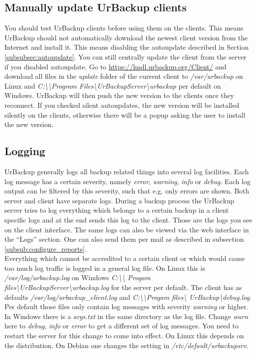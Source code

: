 \documentclass[a4paper,10pt]{article}
\begin{document}
\subsection{Manually update UrBackup clients}
\label{subsec:manually_update_client}

You should test UrBackup clients before using them on the clients. This means
UrBackup should not automatically download the newest client version from
the Internet and install it. This means disabling the autoupdate described in
Section \ref{subsubsec:autoupdate}. You can still centrally update the client
from the server if you disabled autoupdate. Go to \url{https://hndl.urbackup.org/Client/}
and download all files in the \textsl{update} folder of the current client to \textsl{/var/urbackup} on Linux and
\textsl{C:\textbackslash\textbackslash Program Files\textbackslash UrBackupServer\textbackslash urbackup} per default on Windows. UrBackup
will then push the new version to the clients once they reconnect. If you checked
silent autoupdates, the new version will be installed silently on the clients, otherwise
there will be a popup asking the user to install the new version.

\subsection{Logging}
\label{sec:logging}

UrBackup generally logs all backup related things into several log facilities.
Each log message has a certain severity, namely \textsl{error},
\textsl{warning}, \textsl{info} or \textsl{debug}.
Each log output can be filtered by this severity, such that e.g. only errors are
shown. Both server and client have separate logs. During a backup process the
UrBackup server tries to log everything which belongs to a certain backup in a
client specific logs and at the end sends this log to the client. Those are the
logs you see on the client interface. The same logs can also be viewed via the
web interface in the ``Logs'' section. One can also send them per mail as
described in subsection \ref{subsub:configure_reports}.\\
Everything which cannot be accredited to a certain client or which would cause
too much log traffic is logged in a general log file. On Linux this is
\textsl{/var/log/urbackup.log} on Windows \textsl{C:\textbackslash\textbackslash
Progam files\textbackslash UrBackupServer\textbackslash urbackup.log} for the
server per default.  The client has as defaults
\textsl{/var/log/urbackup\_client.log} and
\textsl{C:\textbackslash\textbackslash Progam files\textbackslash
UrBackup\textbackslash debug.log}. Per default those files only contain log
messages with severity \textsl{warning} or higher. In Windows there is a
\textsl{args.txt} in the same directory as the log file. Change \textsl{warn}
here to \textsl{debug}, \textsl{info} or \textsl{error} to get a different set
of log messages. You need to restart the server for this change to come into
effect. On Linux this depends on the distribution. On Debian one changes the
setting in \textsl{/etc/default/urbackupsrv}.
\end{document}
